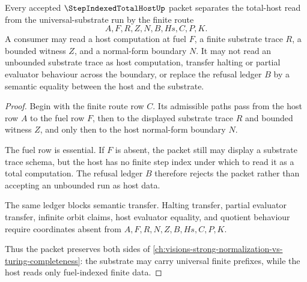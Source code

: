\begin{theorem}
\label{thm:step-indexed-total-host-separation}
Every accepted $\StepIndexedTotalHostUp$ packet separates the total-host read from the universal-substrate run by the finite route
$$
A,F,R,Z,N,B,Hs,C,P,K .
$$
A consumer may read a host computation at fuel $F$, a finite substrate trace $R$, a bounded witness $Z$, and a normal-form boundary $N$. It may not read an unbounded substrate trace as host computation, transfer halting or partial evaluator behaviour across the boundary, or replace the refusal ledger $B$ by a semantic equality between the host and the substrate.
\end{theorem}
\begin{proof}
Begin with the finite route row $C$. Its admissible paths pass from the host row $A$ to the fuel row $F$, then to the displayed substrate trace $R$ and bounded witness $Z$, and only then to the host normal-form boundary $N$.

The fuel row is essential. If $F$ is absent, the packet still may display a substrate trace schema, but the host has no finite step index under which to read it as a total computation. The refusal ledger $B$ therefore rejects the packet rather than accepting an unbounded run as host data.

The same ledger blocks semantic transfer. Halting transfer, partial evaluator transfer, infinite orbit claims, host evaluator equality, and quotient behaviour require coordinates absent from $A,F,R,N,Z,B,Hs,C,P,K$.

Thus the packet preserves both sides of \autoref{ch:visions-strong-normalization-vs-turing-completeness}: the substrate may carry universal finite prefixes, while the host reads only fuel-indexed finite data.
\end{proof}

